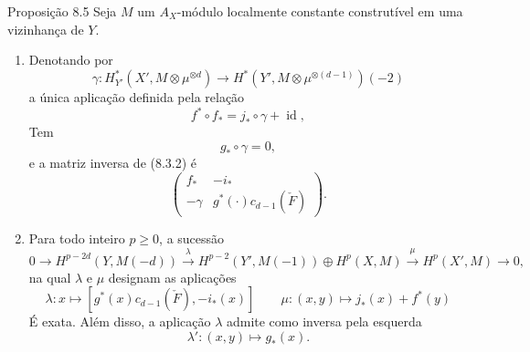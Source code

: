 \begin{statement}{Proposição 8.5}
Seja $M$ um $A_X$-módulo localmente constante construtível em uma vizinhança de $Y$.
\begin{enumerate}[label=\alph*)]
\item Denotando por
\[
\gamma:H_{Y'}^*(X',M\otimes\mu^{\otimes d})\to
H^*(Y',M\otimes\mu^{\otimes(d-1)})(-2)
\]
a única aplicação definida pela relação
\[
f^*\circ f_* = j_*\circ\gamma+\operatorname{id},
\tag{8.5.1}
\]
Tem
\[
g_*\circ\gamma=0,
\tag{8.5.2}
\]
e a matriz inversa de (8.3.2) é
\[
\begin{pmatrix}
f_*&-i_*\\
-\gamma&g^*(\cdot)c_{d-1}(\check F)
\end{pmatrix}.
\tag{8.5.3}
\]
\item Para todo inteiro $p\ge0$, a sucessão
\[
0\to H^{p-2d}(Y,M(-d))
\xrightarrow{\lambda}
H^{p-2}(Y',M(-1))\oplus H^p(X,M)
\xrightarrow{\mu}
H^p(X',M)\to0,
\]
na qual $\lambda$ e $\mu$ designam as aplicações
\[
\lambda : x\longmapsto [g^*(x)c_{d-1}(\check F),-i_*(x)]
\qquad
\mu : (x,y)\mapsto j_*(x)+f^*(y)
\]
É exata. Além disso, a aplicação $\lambda$ admite como inversa pela esquerda
\[
\lambda' : (x,y)\longmapsto g_*(x).
\]
\end{enumerate}
\end{statement}
